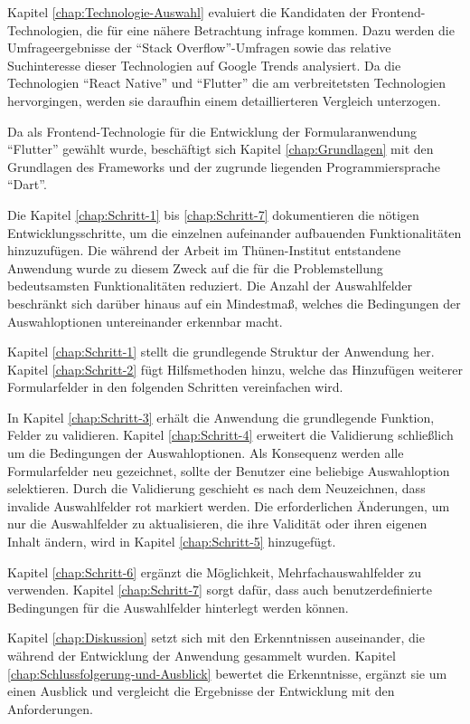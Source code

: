 

Kapitel \ref{chap:Technologie-Auswahl} evaluiert die Kandidaten der Frontend-Technologien,
die für eine nähere Betrachtung infrage kommen.
Dazu werden die Umfrageergebnisse der \enquote{Stack Overflow}-Umfragen sowie das relative Suchinteresse dieser Technologien auf Google Trends analysiert.
Da die Technologien \enquote{React Native} und  \enquote{Flutter}  die am verbreitetsten Technologien hervorgingen, 
werden sie daraufhin einem detaillierteren Vergleich unterzogen.

Da als Frontend-Technologie für die Entwicklung der Formularanwendung \enquote{Flutter} gewählt wurde,
beschäftigt sich Kapitel \ref{chap:Grundlagen} mit den Grundlagen des Frameworks und der zugrunde liegenden Programmiersprache \enquote{Dart}.

Die Kapitel \ref{chap:Schritt-1} bis \ref{chap:Schritt-7} dokumentieren die nötigen Entwicklungsschritte,
um die einzelnen aufeinander aufbauenden  Funktionalitäten hinzuzufügen.
Die während der Arbeit im Thünen-Institut entstandene Anwendung wurde zu diesem Zweck auf die für die  Problemstellung bedeutsamsten Funktionalitäten reduziert.
Die Anzahl der Auswahlfelder beschränkt sich darüber hinaus auf ein Mindestmaß,
welches die Bedingungen der Auswahloptionen untereinander erkennbar macht. 

Kapitel \ref{chap:Schritt-1} stellt die grundlegende Struktur der Anwendung her. Kapitel \ref{chap:Schritt-2} fügt Hilfsmethoden hinzu,
welche  das Hinzufügen  weiterer Formularfelder  in den folgenden Schritten vereinfachen wird.

In Kapitel \ref{chap:Schritt-3} erhält die Anwendung die grundlegende Funktion,
Felder zu validieren.
Kapitel \ref{chap:Schritt-4} erweitert die Validierung schließlich um die Bedingungen der Auswahloptionen.
Als Konsequenz werden alle Formularfelder neu gezeichnet,
sollte  der Benutzer eine beliebige Auswahloption selektieren.
Durch die Validierung  geschieht es nach dem Neuzeichnen,
dass invalide Auswahlfelder rot markiert werden.
Die erforderlichen Änderungen,
um nur die Auswahlfelder zu aktualisieren,
die ihre Validität oder ihren eigenen Inhalt ändern,
wird in Kapitel \ref{chap:Schritt-5} hinzugefügt.

Kapitel \ref{chap:Schritt-6} ergänzt die Möglichkeit,
Mehrfachauswahlfelder zu verwenden.
Kapitel \ref{chap:Schritt-7} sorgt dafür,
dass auch benutzerdefinierte Bedingungen für die Auswahlfelder hinterlegt werden können.

Kapitel \ref{chap:Diskussion} setzt sich mit den Erkenntnissen auseinander,
die während der Entwicklung der Anwendung gesammelt wurden.
Kapitel \ref{chap:Schlussfolgerung-und-Ausblick} bewertet die Erkenntnisse,
ergänzt sie um einen Ausblick und vergleicht die Ergebnisse der Entwicklung mit den Anforderungen.
